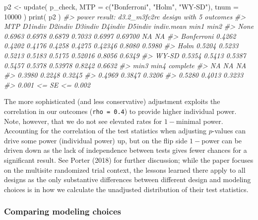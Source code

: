 \documentclass[
]{article}
\newenvironment{Shaded}{\begin{snugshade}}{\end{snugshade}}
\newcommand{\AttributeTok}[1]{\textcolor[rgb]{0.77,0.63,0.00}{#1}}
\newcommand{\CommentTok}[1]{\textcolor[rgb]{0.56,0.35,0.01}{\textit{#1}}}
\newcommand{\DecValTok}[1]{\textcolor[rgb]{0.00,0.00,0.81}{#1}}
\newcommand{\FunctionTok}[1]{\textcolor[rgb]{0.00,0.00,0.00}{#1}}
\newcommand{\NormalTok}[1]{#1}
\newcommand{\OtherTok}[1]{\textcolor[rgb]{0.56,0.35,0.01}{#1}}
\newcommand{\StringTok}[1]{\textcolor[rgb]{0.31,0.60,0.02}{#1}}
\begin{document}
\begin{Shaded}
\begin{Highlighting}[]
\NormalTok{p2 }\OtherTok{\textless{}{-}} \FunctionTok{update}\NormalTok{( p\_check, }\AttributeTok{MTP =} \FunctionTok{c}\NormalTok{(}\StringTok{"Bonferroni"}\NormalTok{, }\StringTok{"Holm"}\NormalTok{, }\StringTok{"WY{-}SD"}\NormalTok{), }\AttributeTok{tnum =} \DecValTok{10000}\NormalTok{ )}
\FunctionTok{print}\NormalTok{( p2 )}
\CommentTok{\#\textgreater{} power result: d3.2\_m3fc2rc design with 5 outcomes}
\CommentTok{\#\textgreater{}         MTP D1indiv D2indiv D3indiv D4indiv D5indiv indiv.mean   min1   min2}
\CommentTok{\#\textgreater{}        None  0.6963  0.6978  0.6879  0.7033  0.6997    0.69700     NA     NA}
\CommentTok{\#\textgreater{}  Bonferroni  0.4262  0.4202  0.4176  0.4258  0.4275    0.42346 0.8080 0.5980}
\CommentTok{\#\textgreater{}        Holm  0.5204  0.5233  0.5213  0.5183  0.5175    0.52016 0.8056 0.6349}
\CommentTok{\#\textgreater{}       WY{-}SD  0.5354  0.5413  0.5387  0.5457  0.5378    0.53978 0.8242 0.6632}
\CommentTok{\#\textgreater{}    min3   min4 complete}
\CommentTok{\#\textgreater{}      NA     NA       NA}
\CommentTok{\#\textgreater{}  0.3980 0.2248   0.3245}
\CommentTok{\#\textgreater{}  0.4969 0.3847   0.3206}
\CommentTok{\#\textgreater{}  0.5280 0.4013   0.3233}
\CommentTok{\#\textgreater{}  0.001 \textless{}= SE \textless{}= 0.002}
\end{Highlighting}
\end{Shaded}

The more sophisticated (and less conservative) adjustment exploits the
correlation in our outcomes (\texttt{rho\ =\ 0.4}) to provide higher
individual power. Note, however, that we do not see elevated rates for
\(1-\)minimal power. Accounting for the correlation of the test
statistics when adjusting \(p\)-values can drive some power (individual
power) up, but on the flip side \(1-\)power can be driven down as the
lack of independence between tests gives fewer chances for a significant
result. See Porter (2018) for further discussion; while the paper
focuses on the multisite randomized trial context, the lessons learned
there apply to all designs as the only substantive differences between
different design and modeling choices is in how we calculate the
unadjusted distribution of their test statistics.

\subsubsection{Comparing modeling choices}
\end{document}
